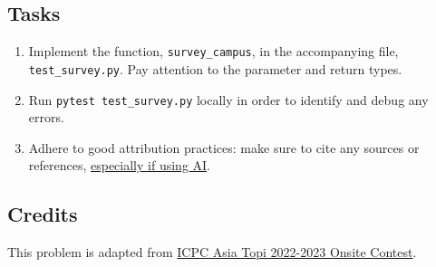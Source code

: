 \documentclass[a4paper]{exam}
\begin{document}
\begin{questions}
	\subsection*{Tasks}
	\begin{enumerate}
		\item Implement the function, \texttt{survey\_campus}, in the accompanying file, \texttt{test\_survey.py}. Pay attention to the parameter and return types.
		\item Run \texttt{pytest test\_survey.py} locally in order to identify and debug any errors.
		\item Adhere to good attribution practices: make sure to cite any sources or references, \href{https://hulms.instructure.com/courses/2616/discussion_topics/29240}{especially if using AI}.
	\end{enumerate}

	\subsection*{Credits}
	This problem is adapted from \href{https://giki.edu.pk/icpc/}{ICPC Asia Topi 2022-2023 Onsite Contest}.

\end{questions}
\end{document}
